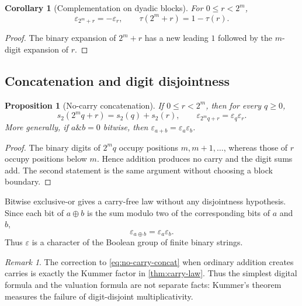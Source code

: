 \documentclass[11pt,oneside]{article}
\newtheorem{proposition}[theorem]{Proposition}
\newtheorem{corollary}[theorem]{Corollary}
\theoremstyle{definition}
\theoremstyle{remark}
\newtheorem{remark}[theorem]{Remark}
\newcommand{\bitsum}{s_2}
\newcommand{\eps}{\varepsilon}
\newcommand{\xor}{\mathbin{\oplus}}
\begin{document}
\begin{corollary}[Complementation on dyadic blocks]\label{cor:block-complement}
For $0\le r<2^m$,
\begin{equation}\label{eq:block-complement}
  \eps_{2^m+r}=-\eps_r,
  \qquad
  \tau(2^m+r)=1-\tau(r).
\end{equation}
\end{corollary}

\begin{proof}
The binary expansion of $2^m+r$ has a new leading $1$ followed by the
$m$-digit expansion of $r$.
\end{proof}

\subsection{Concatenation and digit disjointness}

\begin{proposition}[No-carry concatenation]\label{prop:no-carry-concat}
If $0\le r<2^m$, then for every $q\ge0$,
\begin{equation}\label{eq:no-carry-concat}
 \bitsum(2^mq+r)=\bitsum(q)+\bitsum(r),
 \qquad
 \eps_{2^mq+r}=\eps_q\eps_r.
\end{equation}
More generally, if $a\mathbin{\&}b=0$ bitwise, then
$\eps_{a+b}=\eps_a\eps_b$.
\end{proposition}

\begin{proof}
The binary digits of $2^mq$ occupy positions $m,m+1,\ldots$, whereas those of
$r$ occupy positions below $m$.  Hence addition produces no carry and the
digit sums add.  The second statement is the same argument without choosing a
block boundary.
\end{proof}

Bitwise exclusive-or gives a carry-free law without any disjointness
hypothesis.  Since each bit of $a\xor b$ is the sum modulo two of the
corresponding bits of $a$ and $b$,
\begin{equation}\label{eq:xor-character}
 \boxed{\qquad \eps_{a\xor b}=\eps_a\eps_b.\qquad}
\end{equation}
Thus $\eps$ is a character of the Boolean group of finite binary strings.

\begin{remark}
The correction to \cref{eq:no-carry-concat} when ordinary addition creates
carries is exactly the Kummer factor in \cref{thm:carry-law}.  Thus the
simplest digital formula and the valuation formula are not separate facts:
Kummer's theorem measures the failure of digit-disjoint multiplicativity.
\end{remark}
\end{document}

